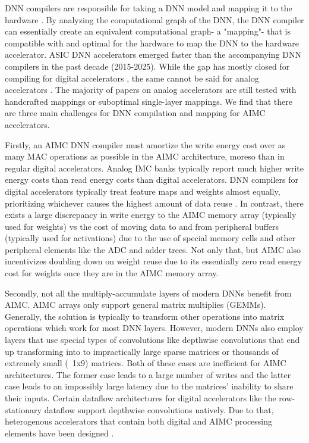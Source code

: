 DNN compilers are responsible for taking a DNN model and mapping it to the hardware \cite{li2020deep}. By analyzing the computational graph of the DNN, the DNN compiler can essentially create an equivalent computational graph- a "mapping"- that is compatible with and optimal for the hardware to map the DNN to the hardware accelerator. ASIC DNN accelerators emerged faster than the accompanying DNN compilers in the past decade (2015-2025). While the gap has mostly closed for compiling for digital accelerators \cite{mei2021zigzag}, the same cannot be said for analog accelerators \cite{chen2018neurosim}. The majority of papers on analog accelerators are still tested with handcrafted mappings \cite{wanneurram,garofalo2022heterogeneous,zhou2022ml} or suboptimal single-layer mappings. We find that there are three main challenges for DNN compilation and mapping for AIMC accelerators.


Firstly, an AIMC DNN compiler must amortize the write energy cost over as many MAC operations as possible in the AIMC architecture, moreso than in regular digital accelerators. Analog IMC banks typically report much higher write energy costs than read energy costs \cite{sebastian2020memory} than digital accelerators. DNN compilers for digital accelerators typically treat feature maps and weights almost equally, prioritizing whichever causes the highest amount of data reuse \cite{mei2023design}. In contrast, there exists a large discrepancy in write energy to the AIMC memory array (typically used for weights) vs the cost of moving data to and from peripheral buffers (typically used for activations) due to the use of special memory cells and other peripheral elements like the ADC and adder trees. Not only that, but AIMC also incentivizes doubling down on weight reuse due to its essentially zero read energy cost for weights once they are in the AIMC memory array.

Secondly, not all the multiply-accumulate layers of modern DNNs benefit from AIMC. AIMC arrays only support general matrix multiplies (GEMMs). Generally, the solution is typically to transform other operations into matrix operations which work for most DNN layers. However, modern DNNs also employ layers that use special types of convolutions like depthwise convolutions \cite{sandler2018mobilenetv2} that end up transforming into to impractically large sparse matrices or thousands of extremely small (~1x9) matrices. Both of these cases are inefficient for AIMC architectures. The former case leads to a large number of writes and the latter case leads to an impossibly large latency due to the matrices' inability to share their inputs. Certain dataflow architectures for digital accelerators like the row-stationary dataflow support depthwise convolutions natively. Due to that, heterogenous accelerators that contain both digital and AIMC processing elements have been designed \cite{garofalo2022heterogeneous,houshmand2022diana}. 

